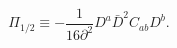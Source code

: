 \begin{equation}
\Pi_{1/2} \equiv - \frac{1}{16 \partial^2} D^a \bar D^2 C_{ab} D^b.
\end{equation}

